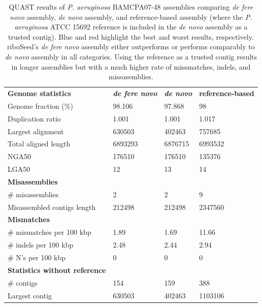 \documentclass[10pt]{article}
\begin{document}
\begin{table}[]
\centering
\caption{QUAST results of \textit{P. aeruginosa} BAMCPA07-48 assemblies comparing \textit{de fere novo} assembly, \textit{de novo} assembly, and reference-based assembly (where the \textit{P. aeruginosa} ATCC 15692 reference is included in the \textit{de novo} assembly as a trusted contig).  Blue and red highlight the best and worst results, respectively.  riboSeed's \textit{de fere novo} assembly either outperforms or performs comparably to \textit{de novo} assembly in all categories.  Using the reference as a trusted contig results in longer assemblies but with a much higher rate of missmatches, indels, and missasemblies.}
\label{table:full_ref_compare}
\begin{tabular}{llll}
\textbf{Genome statistics} & \textbf{\textit{de fere novo}} & \textbf{\textit{de novo}} & \textbf{reference-based} \\
Genome fraction (\%) & \cellcolor[HTML]{CDCDF9}98.106 & \cellcolor[HTML]{FBDADA}97.868 & 98 \\
Duplication ratio & 1.001 & 1.001 & \cellcolor[HTML]{FBDADA}1.017 \\
Largest alignment & 630503 & \cellcolor[HTML]{FBDADA}402463 & \cellcolor[HTML]{CDCDF9}757685 \\
Total aligned length & 6893293 & \cellcolor[HTML]{FBDADA}6876715 & \cellcolor[HTML]{CDCDF9}6993532 \\
NGA50 & 176510 & 176510 & \cellcolor[HTML]{FBDADA}135376 \\
LGA50 & \cellcolor[HTML]{CDCDF9}12 & 13 & \cellcolor[HTML]{FBDADA}14 \\
\textbf{Misassemblies} &  &  &  \\
\# misassemblies & 2 & 2 & \cellcolor[HTML]{FBDADA}9 \\
Misassembled contigs length & 212498 & 212498 & \cellcolor[HTML]{FBDADA}2347560 \\
\textbf{Mismatches} &  &  &  \\
\# mismatches per 100 kbp & 1.89 & \cellcolor[HTML]{CDCDF9}1.69 & \cellcolor[HTML]{FBDADA}11.66 \\
\# indels per 100 kbp & 2.48 & \cellcolor[HTML]{CDCDF9}2.44 & \cellcolor[HTML]{FBDADA}2.94 \\
\# N's per 100 kbp & 0 & 0 & 0 \\
\textbf{Statistics without reference} &  &  &  \\
\# contigs & \cellcolor[HTML]{CDCDF9}154 & 159 & 388 \\
Largest contig & 630503 & \cellcolor[HTML]{FBDADA}402463 & \cellcolor[HTML]{CDCDF9}1103106 \\

\end{tabular}
\end{table}
\end{document}
